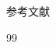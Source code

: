 \documentclass{beamer}
\begin{document}
\begin{frame}[shrink=15]{参考文献}
\begin{thebibliography}{99}
        \end{thebibliography}
    \end{frame}
    
\end{document}
